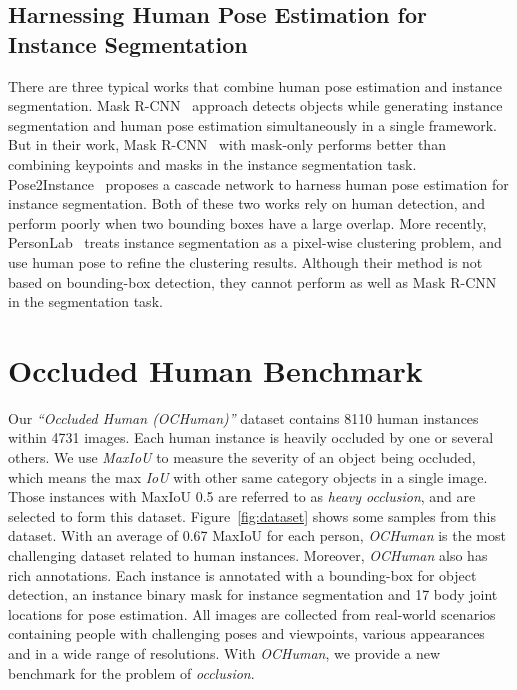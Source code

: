 \documentclass[10pt,twocolumn,letterpaper]{article}
\begin{document}
\subsection{Harnessing Human Pose Estimation for Instance Segmentation}
There are three typical works that combine human pose estimation and instance segmentation. Mask R-CNN~\cite{He2017Mask} approach detects objects while generating instance segmentation and human pose estimation simultaneously in a single framework. But in their work, Mask R-CNN~\cite{He2017Mask} with mask-only performs better than combining keypoints and masks in the instance segmentation task. Pose2Instance~\cite{tripathi2017pose2instance} proposes a cascade network to harness human pose estimation for instance segmentation. Both of these two works rely on human detection, and perform poorly when two bounding boxes have a large overlap. 
More recently, PersonLab~\cite{papandreou2018personlab} treats instance segmentation as a pixel-wise clustering problem, and use human pose to refine the clustering results. Although their method is not based on bounding-box detection, they cannot perform as well as Mask R-CNN~\cite{He2017Mask} in the segmentation task. 




 

\section{Occluded Human Benchmark}

Our \emph{``Occluded Human (OCHuman)''} dataset contains 8110 human instances within 4731 images. Each human instance is heavily occluded by one or several others. We use \emph{MaxIoU} to measure the severity of an object being occluded, which means the max \emph{IoU} with other same category objects in a single image. Those instances with MaxIoU 0.5 are referred to as \emph{heavy occlusion}, and are selected to form this dataset. Figure~\ref{fig:dataset} shows some samples from this dataset. With an average of 0.67 MaxIoU for each person, \emph{OCHuman} is the most challenging dataset related to human instances. Moreover, \emph{OCHuman} also has rich annotations. Each instance is annotated with a bounding-box for object detection, an instance binary mask for instance segmentation and 17 body joint locations for pose estimation. All images are collected from real-world scenarios containing people with challenging poses and viewpoints, various appearances and in a wide range of resolutions. With \emph{OCHuman}, we provide a new benchmark for the problem of \emph{occlusion}.
\end{document}
